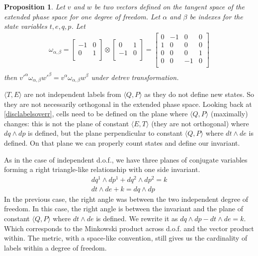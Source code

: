 \documentclass[twocolumn,floatfix,nofootinbib]{revtex4}   %
\theoremstyle{theorem}
\newtheorem{prop}[thm]{Proposition}
\theoremstyle{definition}
\begin{document}
\begin{prop}\label{tdofInvariant}
Let $v$ and $w$ be two vectors defined on the tangent space of the extended phase space for one degree of freedom. Let $\alpha$ and $\beta$ be indexes for the state variables $t, e, q, p$. Let
\begin{align*}
\omega_{\alpha, \beta} =  \left[
  \begin{array}{cc}
    -1 & 0 \\
    0 & 1 \\
  \end{array}
\right] \otimes \left[
  \begin{array}{cc}
    0 & 1 \\
    -1 & 0 \\
  \end{array}
\right]
= \left[
  \begin{array}{cccc}
    0 & -1 & 0 & 0 \\
    1 & 0 & 0 & 0 \\
    0 & 0 & 0 & 1 \\
    0 & 0 & -1 & 0 \\
  \end{array}
\right] \\
\end{align*}
then $v'^{\alpha} \omega_{\alpha, \beta} w'^{\beta}=v^{\alpha} \omega_{\alpha, \beta} w^{\beta}$ under detrev transformation.
\end{prop}

$\langle T, E \rangle$ are not independent labels from $\langle Q, P \rangle$ as they do not define new states. So they are not necessarily orthogonal in the extended phase space. Looking back at \ref{disclabelsoverr}, cells need to be defined on the plane where $\langle Q, P \rangle$ (maximally) changes: this is not the plane of constant $\langle E, T \rangle$ (they are not orthogonal) where $dq \wedge dp$ is defined, but the plane perpendicular to constant $\langle Q, P \rangle$ where $dt \wedge de$ is defined. On that plane we can properly count states and define our invariant.

As in the case of independent d.o.f., we have three planes of conjugate variables forming a right triangle-like relationship with one side invariant.
\begin{align*}
dq^1 \wedge dp^1 + dq^2 \wedge dp^2 = k \\
dt \wedge de + k = dq \wedge dp
\end{align*}
In the previous case, the right angle was between the two independent degree of freedom. In this case, the right angle is between the invariant and the plane of constant $\langle Q, P \rangle$ where $dt \wedge de$ is defined. We rewrite it as $dq \wedge dp - dt \wedge de = k$. Which corresponds to the Minkowski product across d.o.f. and the vector product within. The metric, with a space-like convention, still gives us the cardinality of labels within a degree of freedom.
\end{document}
